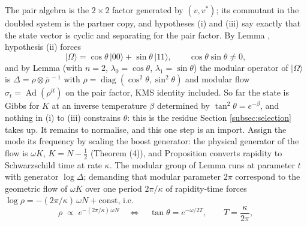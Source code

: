 The pair algebra is the $2 \times 2$ factor generated by $(v, v^*)$; its commutant in the doubled system is the partner copy, and hypotheses (i) and (iii) say exactly that the state vector is cyclic and separating for the pair factor. By Lemma , hypothesis (ii) forces
\[
|\Omega\rangle = \cos\theta\,|00\rangle + \sin\theta\,|11\rangle, \qquad \cos\theta\sin\theta \neq 0 ,
\]
and by Lemma  (with $n = 2$, $\lambda_0 = \cos\theta$, $\lambda_1 = \sin\theta$) the modular operator of $|\Omega\rangle$ is $\Delta = \rho \otimes \bar\rho^{\,-1}$ with $\rho = \operatorname{diag}(\cos^2\theta, \sin^2\theta)$ and modular flow $\sigma_t = \operatorname{Ad}(\rho^{it})$ on the pair factor, KMS identity included. So far the state is Gibbs for $K$ at an inverse temperature $\beta$ determined by $\tan^{2}\theta = e^{-\beta}$, and nothing in (i) to (iii) constrains $\theta$: this is the residue Section \ref{subsec:selection} takes up. It remains to normalise, and this one step is an import. Assign the mode its frequency by scaling the boost generator: the physical generator of the flow is $\omega K$, $K = N - \tfrac12$ (Theorem (4)), and Proposition  converts rapidity to Schwarzschild time at rate $\kappa$. The modular group of Lemma  runs at parameter $t$ with generator $\log\Delta$; demanding that modular parameter $2\pi$ correspond to the geometric flow of $\omega K$ over one period $2\pi/\kappa$ of rapidity-time forces $\log\rho = -(2\pi/\kappa)\,\omega N + \text{const}$, i.e.
\[
\rho \;\propto\; e^{-(2\pi/\kappa)\,\omega N}
\quad\Longleftrightarrow\quad
\tan\theta = e^{-\omega/2T}, \qquad T = \frac{\kappa}{2\pi} ,
\]
